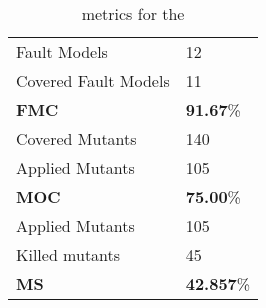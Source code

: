 
\begin{table}[h]

\begin{tabular}{|l|l|}
\hline
Fault Models & 12 \\
Covered Fault Models & 11 \\
\hline
\textbf{FMC} & \textbf{91.67}\% \\
\hline
Covered Mutants & 140 \\
Applied Mutants & 105 \\
\hline
\textbf{MOC} & \textbf{75.00}\% \\
\hline
Applied Mutants & 105 \\
Killed mutants & 45 \\
\hline
\textbf{MS} & \textbf{42.857}\% \\
\hline
\end{tabular}
\caption{\DAMA metrics for the \case}
\label{tab:metrics}
\end{table}
